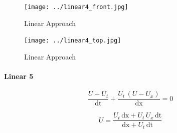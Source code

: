 \documentclass[12pt]{article}
\begin{document}
        \begin{figure}[!ht]
            \begin{minipage}[b]{0.5\textwidth}
              \texttt{[image: ../linear4\_front.jpg]}
              \caption{Linear Approach}
              \label{fig:STDL}
            \end{minipage}
            \begin{minipage}[b]{0.5\textwidth}
              \texttt{[image: ../linear4\_top.jpg]}
              \caption{Linear Approach}
              \label{fig:STDL}
            \end{minipage}
        \end{figure}


        \paragraph{Linear 5}



        \begin{equation}
          \frac{U-U_{t}}{\mathrm{dt}}+\frac{U_{t}\,\left(U-U_{x}\right)}{\mathrm{dx}}=0
        \end{equation}


        \begin{equation}
        U =  \frac{U_{t}\,\mathrm{dx}+U_{t}\,U_{x}\,\mathrm{dt}}{\mathrm{dx}+U_{t}\,\mathrm{dt}}
        \end{equation}
\end{document}
